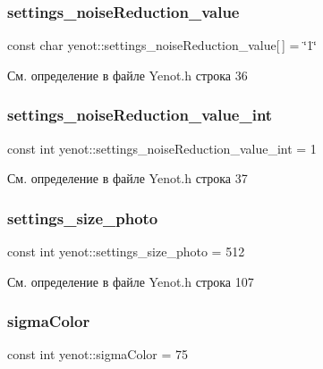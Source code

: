 \subsubsection{\texorpdfstring{settings\+\_\+noise\+Reduction\+\_\+value}{settings\_noiseReduction\_value}}
{\footnotesize\ttfamily const char yenot\+::settings\+\_\+noise\+Reduction\+\_\+value\mbox{[}$\,$\mbox{]} = \char`\"{}1\char`\"{}}



См. определение в файле Yenot.\+h строка 36

\mbox{\label{namespaceyenot_aa228b5315065090d02dadbf128ba3d33}} 
\subsubsection{\texorpdfstring{settings\+\_\+noise\+Reduction\+\_\+value\+\_\+int}{settings\_noiseReduction\_value\_int}}
{\footnotesize\ttfamily const int yenot\+::settings\+\_\+noise\+Reduction\+\_\+value\+\_\+int = 1}



См. определение в файле Yenot.\+h строка 37

\mbox{\label{namespaceyenot_a4e9a58fa114bcb3d3ae09fb62129f2c9}} 
\subsubsection{\texorpdfstring{settings\+\_\+size\+\_\+photo}{settings\_size\_photo}}
{\footnotesize\ttfamily const int yenot\+::settings\+\_\+size\+\_\+photo = 512}



См. определение в файле Yenot.\+h строка 107

\mbox{\label{namespaceyenot_a54032afcd8390f4a4975bbf20ffa248c}} 
\subsubsection{\texorpdfstring{sigma\+Color}{sigmaColor}}
{\footnotesize\ttfamily const int yenot\+::sigma\+Color = 75}



